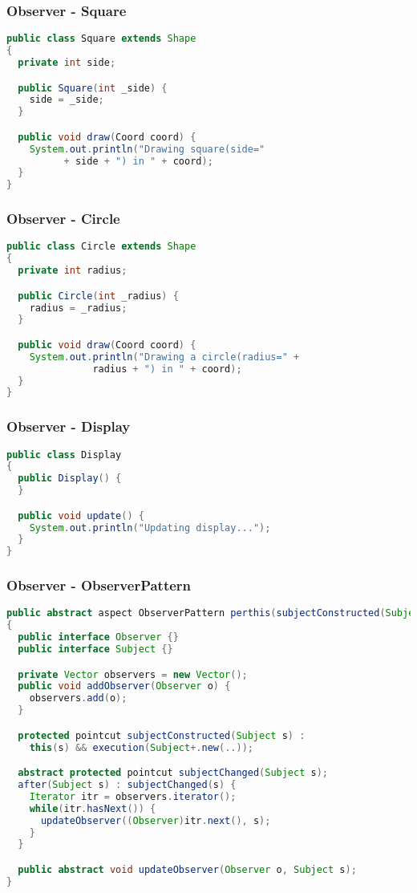 \documentclass[11pt]{beamer}
\begin{document}
\begin{frame}[fragile]
   \frametitle{Observer - Square}
   {\footnotesize
   \begin{lstlisting}[language=java]
public class Square extends Shape
{
  private int side;

  public Square(int _side) {
    side = _side;
  }

  public void draw(Coord coord) {
    System.out.println("Drawing square(side="
          + side + ") in " + coord);
  }
}
   \end{lstlisting}
   }
\end{frame}

\begin{frame}[fragile]
   \frametitle{Observer - Circle}
   {\footnotesize
   \begin{lstlisting}[language=java]
public class Circle extends Shape
{
  private int radius;

  public Circle(int _radius) {
    radius = _radius;
  }

  public void draw(Coord coord) {
    System.out.println("Drawing a circle(radius=" +
               radius + ") in " + coord);
  }
}
   \end{lstlisting}
   }
\end{frame}

\begin{frame}[fragile]
   \frametitle{Observer - Display}
   {\footnotesize
   \begin{lstlisting}[language=java]
public class Display
{
  public Display() {
  }

  public void update() {
    System.out.println("Updating display...");
  }
}
   \end{lstlisting}
   }
\end{frame}

\begin{frame}[fragile]
   \frametitle{Observer - ObserverPattern}
   {\tiny
   \begin{lstlisting}[language=java]
public abstract aspect ObserverPattern perthis(subjectConstructed(Subject))
{
  public interface Observer {}
  public interface Subject {}

  private Vector observers = new Vector();
  public void addObserver(Observer o) {
    observers.add(o);
  }

  protected pointcut subjectConstructed(Subject s) :
    this(s) && execution(Subject+.new(..));

  abstract protected pointcut subjectChanged(Subject s);
  after(Subject s) : subjectChanged(s) {
    Iterator itr = observers.iterator();
    while(itr.hasNext()) {
      updateObserver((Observer)itr.next(), s);
    }
  }

  public abstract void updateObserver(Observer o, Subject s);
}
   \end{lstlisting}
   }
\end{frame}
\end{document}
